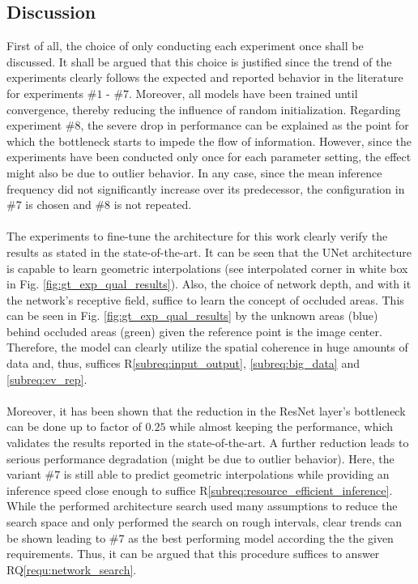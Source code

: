 \subsection{Discussion}
\label{subsec:discussion_unet_arch}
First of all, the choice of only conducting each experiment once shall be discussed. It shall be argued that this choice is justified since the trend of the experiments clearly follows the expected and reported behavior in the literature for experiments $\#1$ - $\#7$. Moreover, all models have been trained until convergence, thereby reducing the influence of random initialization. Regarding experiment $\#8$, the severe drop in performance can be explained as the point for which the bottleneck starts to impede the flow of information. However, since the experiments have been conducted only once for each parameter setting, the effect might also be due to outlier behavior. In any case, since the mean inference frequency did not significantly increase over its predecessor, the configuration in $\#7$ is chosen and $\#8$ is not repeated.  
\\\\
The experiments to fine-tune the architecture for this work clearly verify the results as stated in the state-of-the-art. It can be seen that the UNet architecture is capable to learn geometric interpolations (see interpolated corner in white box in Fig. \ref{fig:gt_exp_qual_results}). Also, the choice of network depth, and with it the network's receptive field, suffice to learn the concept of occluded areas. This can be seen in Fig. \ref{fig:gt_exp_qual_results} by the unknown areas (blue) behind occluded areas (green) given the reference point is the image center. Therefore, the model can clearly utilize the spatial coherence in huge amounts of data and, thus, suffices R\ref{subreq:input_output}, \ref{subreq:big_data} and \ref{subreq:ev_rep}.
\\\\
Moreover, it has been shown that the reduction in the ResNet layer's bottleneck can be done up to factor of $0.25$ while almost keeping the performance, which validates the results reported in the state-of-the-art. A further reduction leads to serious performance degradation (might be due to outlier behavior). Here, the variant $\#7$ is still able to predict geometric interpolations while providing an inference speed close enough to suffice R\ref{subreq:resource_efficient_inference}. While the performed architecture search used many assumptions to reduce the search space and only performed the search on rough intervals, clear trends can be shown leading to $\#7$ as the best performing model according the the given requirements. Thus, it can be argued that this procedure suffices to answer RQ\ref{requ:network_search}.
%
